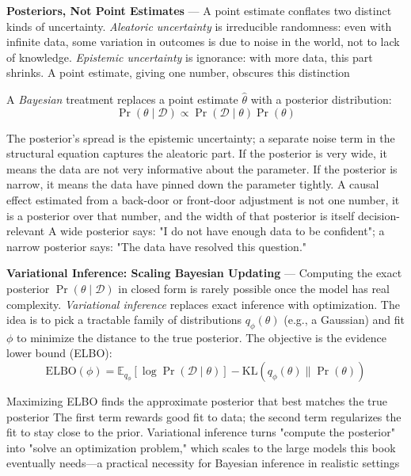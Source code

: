 \textbf{Posteriors, Not Point Estimates} --- A point estimate conflates two distinct
kinds of uncertainty. \emph{Aleatoric uncertainty} is irreducible randomness:
even with infinite data, some variation in outcomes is due to noise in the world,
not to lack of knowledge. \emph{Epistemic uncertainty} is ignorance: with more data,
this part shrinks. A point estimate, giving one number, obscures this distinction

A \emph{Bayesian} treatment replaces a point estimate $\hat{\theta}$ with a posterior
distribution:
\begin{equation}
  \Pr(\theta \mid \mathcal{D}) \propto \Pr(\mathcal{D}\mid \theta) \Pr(\theta) \label{eq:bayes-rule}
\end{equation}

The posterior's spread is the epistemic uncertainty; a separate noise term in
the structural equation captures the aleatoric part. If the posterior is very wide,
it means the data are not very informative about the parameter. If the posterior
is narrow, it means the data have pinned down the parameter tightly. A causal effect
estimated from a back-door or front-door adjustment is not one number, it is a
posterior over that number, and the width of that posterior is itself decision-relevant
A wide posterior says: "I do not have enough data to be confident"; a narrow posterior
says: "The data have resolved this question."

\textbf{Variational Inference: Scaling Bayesian Updating} --- Computing the exact
posterior $\Pr(\theta \mid \mathcal{D})$ in closed form is rarely possible once the
model has real complexity. \emph{Variational inference} replaces exact inference
with optimization. The idea is to pick a tractable family of distributions
$q_{\phi}(\theta)$ (e.g., a Gaussian) and fit $\phi$ to minimize the distance to
the true posterior. The objective is the evidence lower bound (ELBO):
\begin{equation}
  \text{ELBO}(\phi) = \mathbb{E}_{q_\phi}[\log \Pr(\mathcal{D}\mid \theta)] - \text{KL}
  (q_{\phi}(\theta) \| \Pr(\theta)) \label{eq:elbo}
\end{equation}

Maximizing ELBO finds the approximate posterior that best matches the true posterior
The first term rewards good fit to data; the second term regularizes the fit to stay
close to the prior. Variational inference turns "compute the posterior" into "solve
an optimization problem," which scales to the large models this book eventually needs—a
practical necessity for Bayesian inference in realistic settings

